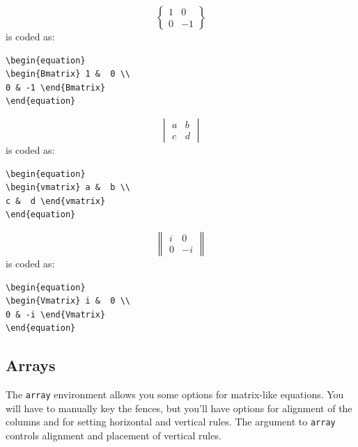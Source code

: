 \documentclass[lettersize,journal]{IEEEtran}
\begin{document}
\begin{equation}
\begin{Bmatrix} 1 &  0 \\ 
0 & -1 \end{Bmatrix}
\end{equation}
is coded as:
\begin{verbatim}
\begin{equation}
\begin{Bmatrix} 1 &  0 \\ 
0 & -1 \end{Bmatrix}
\end{equation}\end{verbatim}

\begin{equation}
\begin{vmatrix} a &  b \\ 
c &  d \end{vmatrix}
\end{equation}
is coded as:
\begin{verbatim}
\begin{equation}
\begin{vmatrix} a &  b \\ 
c &  d \end{vmatrix}
\end{equation}\end{verbatim}

\begin{equation}
\begin{Vmatrix} i &  0 \\ 
0 & -i \end{Vmatrix}
\end{equation}
is coded as:
\begin{verbatim}
\begin{equation}
\begin{Vmatrix} i &  0 \\ 
0 & -i \end{Vmatrix}
\end{equation}\end{verbatim}

\subsection{Arrays}
\noindent The {\tt{array}} environment allows you some options for matrix-like equations. You will have to manually key the fences, but you'll have options for alignment of the columns and for setting horizontal and vertical rules. The argument to {\tt{array}} controls alignment and placement of vertical rules.
\end{document}
